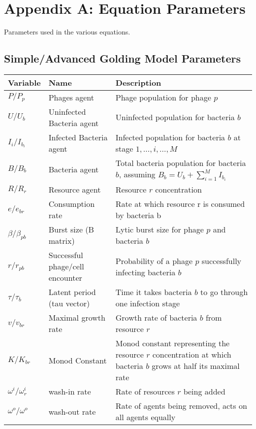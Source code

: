 \chapter{Appendix A: Equation Parameters}
\label{AppendixA}
Parameters used in the various equations. 

\section{Simple/Advanced Golding Model Parameters}
\begin{table}[h!]
    \small %
    \centering
    \begin{tabularx}{\textwidth}{l l X}
        \toprule
        \textbf{Variable} & \textbf{Name} & \textbf{Description} \\
        \midrule
        $P / P_p$ & Phages agent & Phage population for phage $p$ \\
        $U / U_b$ & Uninfected Bacteria agent & Uninfected population for bacteria $b$ \\
        $I_i / I_{b_i}$ & Infected Bacteria agent & Infected population for bacteria $b$ at stage $1, \dots, i, \dots, M$ \\
        $B / B_b$ & Bacteria agent & Total bacteria population for bacteria $b$, assuming $B_b = U_b + \sum_{i=1}^M I_{b_i}$ \\
        $R / R_r$ & Resource agent & Resource $r$ concentration\\
        $e / e_{b r}$ & Consumption rate& Rate at which resource r is consumed by bacteria b\\
        $\beta / \beta_{p b}$ & Burst size (B matrix)& Lytic burst size for phage $p$ and bacteria $b$\\
        $r / r_{p b}$ & Successful phage/cell encounter & Probability of a phage $p$ successfully infecting bacteria $b$\\
        $\tau / \tau_{b}$ & Latent period (tau vector)& Time it takes bacteria $b$ to go through one infection stage\\
        $v / v_{b r}$ & Maximal growth rate & Growth rate of bacteria $b$ from resource $r$ \\
        $K / K_{b r}$ & Monod Constant & Monod constant representing the resource $r$ concentration at which bacteria $b$ grows at half its maximal rate\\
        $\omega^i / \omega^i_r$ & wash-in rate & Rate of resources $r$ being added\\
        $\omega^o / \omega^o$ & wash-out rate & Rate of agents being removed, acts on all agents equally\\

\end{tabularx}
\end{table}
